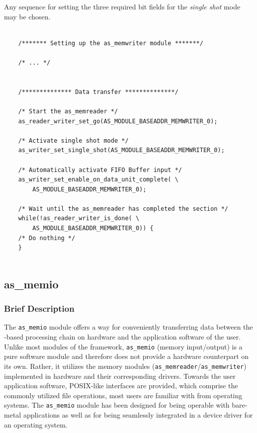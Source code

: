 Any sequence for setting the three required bit fields for the \textit{single shot} mode may be chosen.


\begin{footnotesize}
    \begin{lstlisting}[label=lst:memwriter_single_shot]
    
    /******* Setting up the as_memwriter module *******/
    
    /* ... */
    
    
    /************** Data transfer **************/
    
    /* Start the as_memreader */
    as_reader_writer_set_go(AS_MODULE_BASEADDR_MEMWRITER_0);
    
    /* Activate single shot mode */
    as_writer_set_single_shot(AS_MODULE_BASEADDR_MEMWRITER_0);
        
    /* Automatically activate FIFO Buffer input */
    as_writer_set_enable_on_data_unit_complete( \
        AS_MODULE_BASEADDR_MEMWRITER_0);
    
    /* Wait until the as_memreader has completed the section */
    while(!as_reader_writer_is_done( \
        AS_MODULE_BASEADDR_MEMWRITER_0)) {
    /* Do nothing */
    }
    
    \end{lstlisting}
\end{footnotesize}



\subsection{as\_memio} \label{ch:07-basic-modules-as_memio}



\subsubsection{Brief Description}
The \texttt{as\_memio} module offers a way for conveniently transferring data between the \asterics-based processing chain on hardware and the application software of the user.
Unlike most modules of the \asterics framework, \texttt{as\_memio} (memory input/output) is a pure software module and therefore does not provide a hardware counterpart on its own.
Rather, it utilizes the memory modules (\texttt{as\_memreader}/\texttt{as\_memwriter}) implemented in hardware and their corresponding drivers.
Towards the user application software, POSIX-like interfaces are provided, which comprise the commonly utilized file operations, most users are familiar with from operating systems.
The \texttt{as\_memio} module has been designed for being operable with bare-metal applications as well as for being seamlessly integrated in a device driver for an operating system. 


